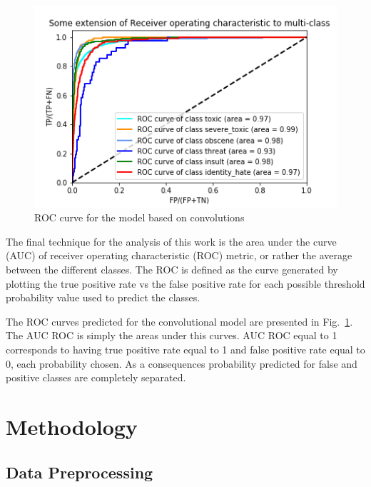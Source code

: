 \documentclass{report}
\begin{document}
\begin{figure}[!h]
\centering
  \includegraphics[width=120mm]{../local/plots_tables/rocs.png}
  \caption{ROC curve for the model based on convolutions}
  \label{fig:rocs}
\end{figure}

The final technique for the analysis of this work is the 
area under the curve (AUC) of receiver operating characteristic (ROC)
 metric, or rather the average between the different classes. The ROC is defined 
 as the curve generated by plotting the true positive rate  vs the false positive rate 
 for each possible threshold probability value used to predict the classes. 
 
 
 The ROC curves predicted for the convolutional model 
 are presented in Fig.~\ref{fig:rocs}. The AUC ROC is simply the areas under this curves. 
 AUC ROC equal to 1 corresponds to having true positive rate equal to 1 and 
 false positive rate  equal to 0, each probability chosen. As a consequences probability
 predicted for false and positive classes are completely separated. 
 

\chapter{Methodology}

\section{Data Preprocessing}
\end{document}
